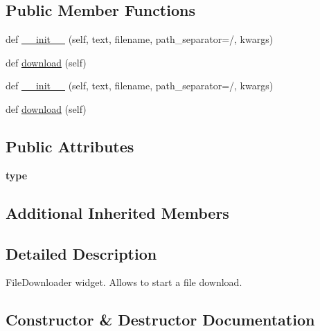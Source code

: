 \subsection*{Public Member Functions}
\begin{DoxyCompactItemize}
\item 
def \hyperlink{classremi_1_1gui_1_1FileDownloader_af9c5140851d943c31950bf2dbdb01864}{\+\_\+\+\_\+init\+\_\+\+\_\+} (self, text, filename, path\+\_\+separator=\textquotesingle{}/\textquotesingle{}, kwargs)
\item 
def \hyperlink{classremi_1_1gui_1_1FileDownloader_ad84ce02d7d00e8895735247e3e8f0d5d}{download} (self)
\item 
def \hyperlink{classremi_1_1gui_1_1FileDownloader_af9c5140851d943c31950bf2dbdb01864}{\+\_\+\+\_\+init\+\_\+\+\_\+} (self, text, filename, path\+\_\+separator=\textquotesingle{}/\textquotesingle{}, kwargs)
\item 
def \hyperlink{classremi_1_1gui_1_1FileDownloader_ad84ce02d7d00e8895735247e3e8f0d5d}{download} (self)
\end{DoxyCompactItemize}
\subsection*{Public Attributes}
\begin{DoxyCompactItemize}
\item 
{\bfseries type}\hypertarget{classremi_1_1gui_1_1FileDownloader_acfe49c159fb3a584a911384df0cb17ea}{}\label{classremi_1_1gui_1_1FileDownloader_acfe49c159fb3a584a911384df0cb17ea}

\end{DoxyCompactItemize}
\subsection*{Additional Inherited Members}


\subsection{Detailed Description}
\begin{DoxyVerb}FileDownloader widget. Allows to start a file download.\end{DoxyVerb}
 

\subsection{Constructor \& Destructor Documentation}
